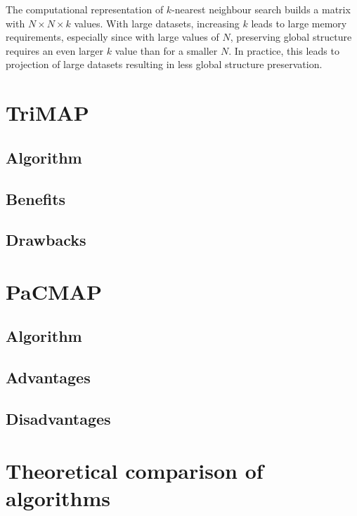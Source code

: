 The computational representation of $k$-nearest neighbour search builds a matrix with $N \times N \times k$ values. With large datasets, increasing $k$ leads to large memory requirements, especially since with large values of $N$, preserving global structure requires an even larger $k$ value than for a smaller $N$. In practice, this leads to projection of large datasets resulting in less global structure preservation.

\section{TriMAP}\label{sec:trimap}



\subsection{Algorithm}



\subsection{Benefits}



\subsection{Drawbacks}



\section{PaCMAP}\label{sec:pacmap}



\subsection{Algorithm}



\subsection{Advantages}



\subsection{Disadvantages}



\section{Theoretical comparison of algorithms}

